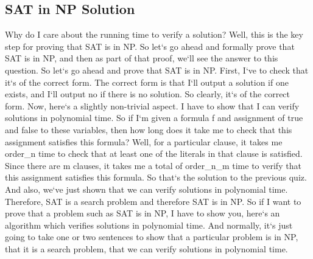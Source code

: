 \subsection{SAT in NP Solution}
Why do I care about the running time to verify a solution? Well, this is the key step for proving that SAT is in NP\@.
So let`s go ahead and formally prove that SAT is in NP, and then as part of that proof, we`ll see the answer to this question.
So let`s go ahead and prove that SAT is in NP\@.
First, I`ve to check that it`s of the correct form.
The correct form is that I`ll output a solution if one exists, and I`ll output no if there is no solution.
So clearly, it`s of the correct form.
Now, here`s a slightly non-trivial aspect.
I have to show that I can verify solutions in polynomial time.
So if I`m given a formula f and assignment of true and false to these variables, then how long does it take me to check that this assignment satisfies this formula? Well, for a particular clause, it takes me order\_n time to check that at least one of the literals in that clause is satisfied.
Since there are m clauses, it takes me a total of order\_n\_m time to verify that this assignment satisfies this formula.
So that`s the solution to the previous quiz.
And also, we`ve just shown that we can verify solutions in polynomial time.
Therefore, SAT is a search problem and therefore SAT is in NP\@.
So if I want to prove that a problem such as SAT is in NP, I have to show you, here`s an algorithm which verifies solutions in polynomial time.
And normally, it`s just going to take one or two sentences to show that a particular problem is in NP, that it is a search problem, that we can verify solutions in polynomial time.


